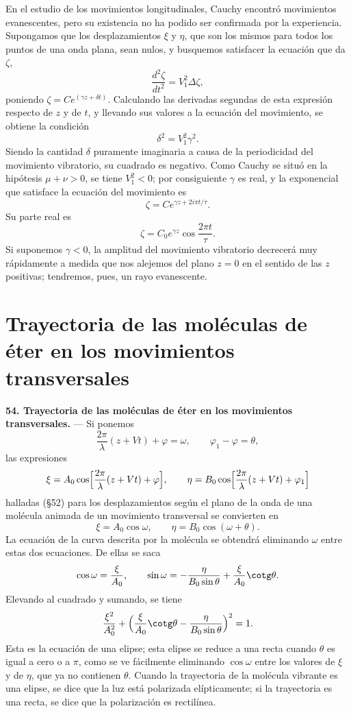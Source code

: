 En el estudio de los movimientos longitudinales, Cauchy encontró
movimientos evanescentes, pero su existencia no ha podido ser confirmada
por la experiencia. Supongamos que los desplazamientos $\xi$ y $\eta$,
que son los mismos para todos los puntos de una onda plana, sean nulos, y
busquemos satisfacer la ecuación que da $\zeta$,
\[
\frac{d^2\zeta}{dt^2}=V_1^2\Delta\zeta,
\]
poniendo $\zeta=Ce^{(\gamma z+\delta t)}$. Calculando las derivadas
segundas de esta expresión respecto de $z$ y de $t$, y llevando sus
valores a la ecuación del movimiento, se obtiene la condición
\[
\delta^2=V_1^2\gamma^2.
\]
Siendo la cantidad $\delta$ puramente imaginaria a causa de la
periodicidad del movimiento vibratorio, su cuadrado es negativo. Como
Cauchy se situó en la hipótesis $\mu+\nu>0$, se tiene $V_1^2<0$; por
consiguiente $\gamma$ es real, y la exponencial que satisface la
ecuación del movimiento es
\[
\zeta=Ce^{\gamma z+2i\pi t/\tau}.
\]
Su parte real es
\[
\zeta=C_0e^{\gamma z}\cos\frac{2\pi t}{\tau}.
\]
Si suponemos $\gamma<0$, la amplitud del movimiento vibratorio decrecerá
muy rápidamente a medida que nos alejemos del plano $z=0$ en el sentido
de las $z$ positivas; tendremos, pues, un rayo evanescente.

\section{Trayectoria de las moléculas de éter en los movimientos
transversales}

\noindent\textbf{54. Trayectoria de las moléculas de éter en los
movimientos transversales.} — Si ponemos
\[
\frac{2\pi}{\lambda}(z+Vt)+\varphi=\omega,\qquad \varphi_1-\varphi=\theta,
\]
las expresiones
\[
\xi=A_0\cos\Bigl[\frac{2\pi}{\lambda}(z+Vt)+\varphi\Bigr],\qquad
\eta=B_0\cos\Bigl[\frac{2\pi}{\lambda}(z+Vt)+\varphi_1\Bigr]
\]
halladas (§52) para los desplazamientos según el plano de la onda de una
molécula animada de un movimiento transversal se convierten en
\[
\xi=A_0\cos\omega,\qquad \eta=B_0\cos(\omega+\theta).
\]
La ecuación de la curva descrita por la molécula se obtendrá eliminando
$\omega$ entre estas dos ecuaciones. De ellas se saca
\[
\cos\omega=\frac{\xi}{A_0},\qquad
\sin\omega=-\frac{\eta}{B_0\sin\theta}+\frac{\xi}{A_0}\cotg\theta.
\]
Elevando al cuadrado y sumando, se tiene
\[
\frac{\xi^2}{A_0^2}+\Bigl(\frac{\xi}{A_0}\cotg\theta-\frac{\eta}{B_0\sin\theta}\Bigr)^2=1.
\]
Esta es la ecuación de una elipse; esta elipse se reduce a una recta
cuando $\theta$ es igual a cero o a $\pi$, como se ve fácilmente
eliminando $\cos\omega$ entre los valores de $\xi$ y de $\eta$, que ya no
contienen $\theta$. Cuando la trayectoria de la molécula vibrante es una
elipse, se dice que la luz está polarizada elípticamente; si la
trayectoria es una recta, se dice que la polarización es rectilínea.

